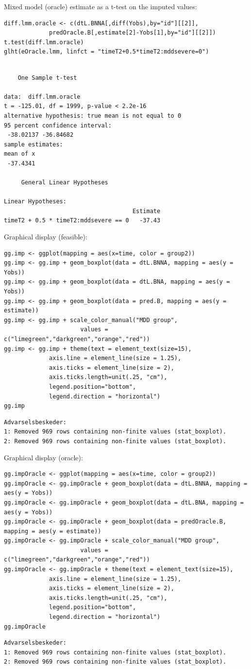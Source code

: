 \documentclass[12pt]{article}
\begin{document}
Mixed model (oracle) estimate as a t-test on the imputed values:
\lstset{language=r,label= ,caption= ,captionpos=b,numbers=none}
\begin{lstlisting}
diff.lmm.oracle <- c(dtL.BNNA[,diff(Yobs),by="id"][[2]],
		     predOracle.B[,estimate[2]-Yobs[1],by="id"][[2]])
t.test(diff.lmm.oracle)
glht(eOracle.lmm, linfct = "timeT2+0.5*timeT2:mddsevere=0")

\end{lstlisting}

\begin{verbatim}

	One Sample t-test

data:  diff.lmm.oracle
t = -125.01, df = 1999, p-value < 2.2e-16
alternative hypothesis: true mean is not equal to 0
95 percent confidence interval:
 -38.02137 -36.84682
sample estimates:
mean of x 
 -37.4341

	 General Linear Hypotheses

Linear Hypotheses:
                                     Estimate
timeT2 + 0.5 * timeT2:mddsevere == 0   -37.43
\end{verbatim}

Graphical display (feasible):
\lstset{language=r,label= ,caption= ,captionpos=b,numbers=none}
\begin{lstlisting}
gg.imp <- ggplot(mapping = aes(x=time, color = group2))
gg.imp <- gg.imp + geom_boxplot(data = dtL.BNNA, mapping = aes(y = Yobs))
gg.imp <- gg.imp + geom_boxplot(data = dtL.BNA, mapping = aes(y = Yobs))
gg.imp <- gg.imp + geom_boxplot(data = pred.B, mapping = aes(y = estimate))
gg.imp <- gg.imp + scale_color_manual("MDD group",
				      values = c("limegreen","darkgreen","orange","red"))
gg.imp <- gg.imp + theme(text = element_text(size=15),
			 axis.line = element_line(size = 1.25),
			 axis.ticks = element_line(size = 2),
			 axis.ticks.length=unit(.25, "cm"),
			 legend.position="bottom",
			 legend.direction = "horizontal")
gg.imp
\end{lstlisting}

\begin{verbatim}
Advarselsbeskeder:
1: Removed 969 rows containing non-finite values (stat_boxplot). 
2: Removed 969 rows containing non-finite values (stat_boxplot).
\end{verbatim}


Graphical display (oracle):
\lstset{language=r,label= ,caption= ,captionpos=b,numbers=none}
\begin{lstlisting}
gg.impOracle <- ggplot(mapping = aes(x=time, color = group2))
gg.impOracle <- gg.impOracle + geom_boxplot(data = dtL.BNNA, mapping = aes(y = Yobs))
gg.impOracle <- gg.impOracle + geom_boxplot(data = dtL.BNA, mapping = aes(y = Yobs))
gg.impOracle <- gg.impOracle + geom_boxplot(data = predOracle.B, mapping = aes(y = estimate))
gg.impOracle <- gg.impOracle + scale_color_manual("MDD group",
				      values = c("limegreen","darkgreen","orange","red"))
gg.impOracle <- gg.impOracle + theme(text = element_text(size=15),
			 axis.line = element_line(size = 1.25),
			 axis.ticks = element_line(size = 2),
			 axis.ticks.length=unit(.25, "cm"),
			 legend.position="bottom",
			 legend.direction = "horizontal")
gg.impOracle
\end{lstlisting}

\begin{verbatim}
Advarselsbeskeder:
1: Removed 969 rows containing non-finite values (stat_boxplot). 
2: Removed 969 rows containing non-finite values (stat_boxplot).
\end{verbatim}
\end{document}
